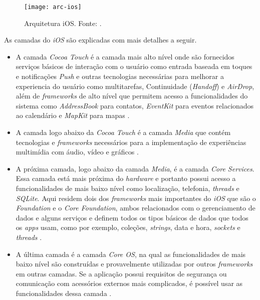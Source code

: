 \begin{figure}[H]
  \centering
    \texttt{[image: arc-ios]}
    \caption[Arquitetura iOS]{ Arquitetura iOS. Fonte: \cite{apple_inc_tech_2014}.}
	\label{fig:arc-ios}
\end{figure}

As camadas do \textit{iOS} são explicadas com mais detalhes a seguir.
 
\begin{itemize}
	\item A camada \textit{Cocoa Touch} é a camada mais alto nível onde são fornecidos serviços básicos de interação 
    com o usuário como entrada baseada em toques e notificações \textit{Push} e outras tecnologias necessárias para
     melhorar a experiencia do usuário como multitarefas, Continuidade (\textit{Handoff}) e \textit{AirDrop}, além de \textit{frameworks} 
     de alto nível que permitem acesso a funcionalidades do sistema como \textit{AddressBook} para contatos, \textit{EventKit} 
     para eventos relacionados ao calendário e \textit{MapKit} para mapas \cite{apple_inc_tech_2014}.
	\item A camada logo abaixo da \textit{Cocoa Touch} é a camada \textit{Media} que contém tecnologias e \textit{frameworks} necessários 
    para a implementação de experiências multimídia com áudio, vídeo e gráficos \cite{apple_inc_tech_2014}.
	\item A próxima camada, logo abaixo da camada \textit{Media}, é a camada \textit{Core Services}. Essa camada está mais próxima 
    do \textit{hardware} e portanto possui acesso a funcionalidades de mais baixo nível como localização, telefonia, \textit{threads} 
    e \textit{SQLite}. Aqui residem dois dos \textit{frameworks} mais importantes do \textit{iOS} que são o \textit{Foundation} e o \textit{Core Foundation}, 
    ambos relacionados com o gerenciamento de dados e alguns serviços e definem todos os tipos básicos de dados que 
    todos os \textit{apps} usam, como por exemplo, coleções, \textit{strings}, data e hora, \textit{sockets} e \textit{threads} \cite{apple_inc_tech_2014}.
	\item A última camada é a camada \textit{Core OS}, na qual as funcionalidades de mais baixo nível são construídas e 
    provavelmente utilizadas por outros \textit{frameworks} em outras camadas. Se a aplicação possui requisitos de segurança 
    ou comunicação com acessórios externos mais complicados, é possível usar as funcionalidades dessa camada \cite{apple_inc_tech_2014}.
\end{itemize}

